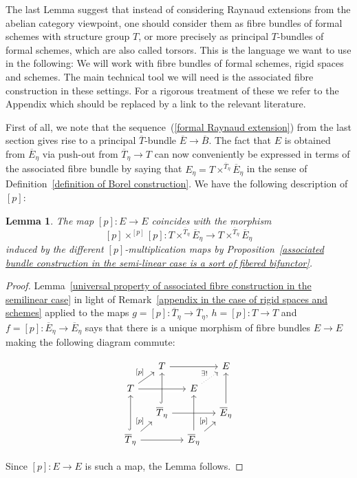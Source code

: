 \documentclass[11pt,oneside]{amsart}
\newtheorem{lemma}[theorem]{Lemma}
\theoremstyle{definition}
\theoremstyle{remark}
\begin{document}
	The last Lemma suggest that instead of considering Raynaud extensions from the abelian category viewpoint, one should consider them as fibre bundles of formal schemes with structure group $T$, or more precisely as principal $T$-bundles of formal schemes, which are also called torsors. This is the language we want to use in the following: We will work with fibre bundles of formal schemes, rigid spaces and schemes. The main technical tool we will need is the associated fibre construction in these settings. For a rigorous  treatment of these we refer to the Appendix {\color{red} which should be replaced by a link to the relevant literature}.
	
	First of all, we note that the sequence~(\ref{formal Raynaud extension}) from the last section gives rise to a principal $\overline{T}$-bundle
	$\overline{E}\rightarrow \overline{B}$. The fact that $E$ is obtained from $\overline{E}_\eta$ via push-out from $\overline{T}_\eta\rightarrow T$ can now conveniently be expressed in terms of the associated fibre bundle by saying that $E_\eta = T\times^{\overline{T}_\eta}\overline{E}_\eta$ in the sense of Definition~\ref{definition of Borel construction}. We have the following description of $[p]$:
	\begin{lemma}\label{p-multiplication is induced from Borel construction}
		The map $[p]:E\rightarrow E$ coincides with the morphism 
		\[[p]\times^{[p]}[p]: T\times^{\overline{T}_\eta}\overline{E}_\eta\rightarrow T\times^{\overline{T}_\eta}\overline{E}_\eta\]
		induced by the different $[p]$-multiplication maps by Proposition~\ref{associated bundle construction in the semi-linear case is a sort of fibered bifunctor}.
	\end{lemma}
	\begin{proof}
		Lemma~\ref{universal property of associated fibre construction in the semilinear case} in light of Remark~\ref{appendix in the case of rigid spaces and schemes} applied to the maps $g=[p]:\overline{T}_\eta\rightarrow \overline{T}_\eta$, $h=[p]:T\rightarrow T$ and $f=[p]:\overline{E}_\eta\rightarrow \overline{E}_\eta$ says that there is a unique morphism of fibre bundles $E\rightarrow E$ making the following diagram commute:
		\begin{center}
			\begin{equation}\label{rigid p-multiplication cube}
			\begin{tikzcd}[row sep = small, column sep = small]
				& T \arrow[rr] &  & E \\
				T \arrow[ru, "{[p]}"] \arrow[rr,crossing over] &  & E \arrow[ru, "\exists!", dotted] &  \\
				& \overline{T}_\eta \arrow[uu, hook] \arrow[rr,crossing over] &  & \overline{E}_\eta \arrow[uu] \\
				\overline{T}_\eta \arrow[ru, "{[p]}"] \arrow[uu, hook] \arrow[rr] &  & \overline{E}_\eta \arrow[ru, "{[p]}"] \arrow[uu] & 
			\end{tikzcd}
			\end{equation}
		\end{center}
		Since $[p]:E\rightarrow E$ is such a map, the Lemma follows.
	\end{proof}
	
\end{document}
